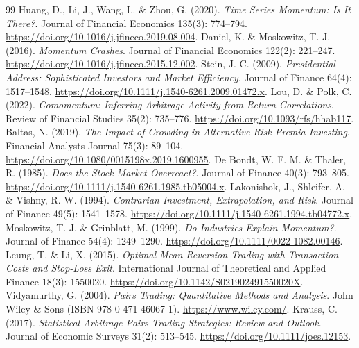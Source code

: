\begin{thebibliography}{99}
 Huang, D., Li, J., Wang, L. \& Zhou, G. (2020). \emph{Time Series Momentum: Is It There?}. Journal of Financial Economics 135(3): 774--794. \href{https://doi.org/10.1016/j.jfineco.2019.08.004}{https://doi.org/10.1016/j.jfineco.2019.08.004}.
 Daniel, K. \& Moskowitz, T. J. (2016). \emph{Momentum Crashes}. Journal of Financial Economics 122(2): 221--247. \href{https://doi.org/10.1016/j.jfineco.2015.12.002}{https://doi.org/10.1016/j.jfineco.2015.12.002}.
 Stein, J. C. (2009). \emph{Presidential Address: Sophisticated Investors and Market Efficiency}. Journal of Finance 64(4): 1517--1548. \href{https://doi.org/10.1111/j.1540-6261.2009.01472.x}{https://doi.org/10.1111/j.1540-6261.2009.01472.x}.
 Lou, D. \& Polk, C. (2022). \emph{Comomentum: Inferring Arbitrage Activity from Return Correlations}. Review of Financial Studies 35(2): 735--776. \href{https://doi.org/10.1093/rfs/hhab117}{https://doi.org/10.1093/rfs/hhab117}.
 Baltas, N. (2019). \emph{The Impact of Crowding in Alternative Risk Premia Investing}. Financial Analysts Journal 75(3): 89--104. \href{https://doi.org/10.1080/0015198x.2019.1600955}{https://doi.org/10.1080/0015198x.2019.1600955}.
 De Bondt, W. F. M. \& Thaler, R. (1985). \emph{Does the Stock Market Overreact?}. Journal of Finance 40(3): 793--805. \href{https://doi.org/10.1111/j.1540-6261.1985.tb05004.x}{https://doi.org/10.1111/j.1540-6261.1985.tb05004.x}.
 Lakonishok, J., Shleifer, A. \& Vishny, R. W. (1994). \emph{Contrarian Investment, Extrapolation, and Risk}. Journal of Finance 49(5): 1541--1578. \href{https://doi.org/10.1111/j.1540-6261.1994.tb04772.x}{https://doi.org/10.1111/j.1540-6261.1994.tb04772.x}.
 Moskowitz, T. J. \& Grinblatt, M. (1999). \emph{Do Industries Explain Momentum?}. Journal of Finance 54(4): 1249--1290. \href{https://doi.org/10.1111/0022-1082.00146}{https://doi.org/10.1111/0022-1082.00146}.
 Leung, T. \& Li, X. (2015). \emph{Optimal Mean Reversion Trading with Transaction Costs and Stop-Loss Exit}. International Journal of Theoretical and Applied Finance 18(3): 1550020. \href{https://doi.org/10.1142/S021902491550020X}{https://doi.org/10.1142/S021902491550020X}.
 Vidyamurthy, G. (2004). \emph{Pairs Trading: Quantitative Methods and Analysis}. John Wiley \& Sons (ISBN 978-0-471-46067-1). \href{https://www.wiley.com/}{https://www.wiley.com/}.
 Krauss, C. (2017). \emph{Statistical Arbitrage Pairs Trading Strategies: Review and Outlook}. Journal of Economic Surveys 31(2): 513--545. \href{https://doi.org/10.1111/joes.12153}{https://doi.org/10.1111/joes.12153}.

\end{thebibliography}

